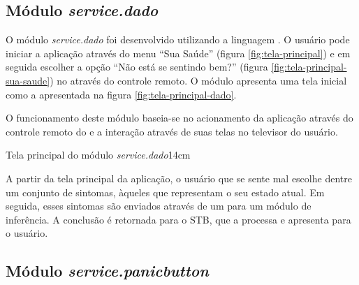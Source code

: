 \subsection{Módulo \textit{service.dado}}\label{subsec:dado}

O módulo \textit{service.dado} foi desenvolvido utilizando a linguagem 
\python[]. O usuário pode iniciar a aplicação através do menu ``Sua Saúde''
(figura \ref{fig:tela-principal}) e em seguida escolher a opção ``Não está se 
sentindo bem?'' (figura \ref{fig:tela-principal-sua-saude}) no \stb[] através do 
controle remoto. O módulo apresenta uma tela inicial como a apresentada na 
figura \ref{fig:tela-principal-dado}.

O funcionamento deste módulo baseia-se no acionamento da aplicação através
do controle remoto do \stb[] e a interação através de suas telas no televisor
do usuário. 

{Tela principal do módulo \textit{service.dado}}{14cm}

A partir da tela principal da aplicação, o usuário que se sente mal escolhe 
dentre um conjunto de sintomas, àqueles que representam o seu estado atual. Em
seguida, esses sintomas são enviados através de um \webservice[] para um
módulo de inferência. A conclusão é retornada para o STB, que a processa e 
apresenta para o usuário.

\subsection{Módulo \textit{service.panicbutton}}\label{subsec:panicbutton}

